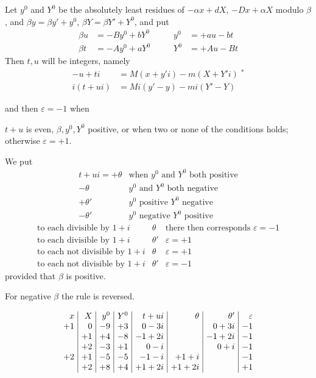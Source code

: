 Let $y^0$ and $Y^0$ be the absolutely least residues of $-\alpha x+dX$, $-Dx+\alpha X$ modulo $\beta$, and $\beta y=\beta y'+y^0$, $\beta Y=\beta Y'+Y^0$, and put
\[
\begin{alignedat}{2}
\beta u&=-By^0+bY^0\qquad&y^0&=+au-bt\\
\beta t&=-Ay^0+aY^0&Y^0&=+Au-Bt
\end{alignedat}
\]
Then $t,u$ will be integers, namely
\[
\begin{aligned}
-u+ti&=M(x+y'i)-m(X+Y'i)\;{}^*\\
i(t+ui)&=Mi(y'-y)-mi(Y'-Y)
\end{aligned}
\]

and then $\varepsilon=-1$ when\par
\noindent $t+u$ is even, $\beta,y^0,Y^0$ positive, or when two or none of the conditions holds; otherwise $\varepsilon=+1$.\par
{}
We put
\[
\begin{array}{rl}
t+ui=+\theta&\text{when }y^0\text{ and }Y^0\text{ both positive}\\
-\theta&y^0\text{ and }Y^0\text{ both negative}\\
+\theta'&y^0\text{ positive }Y^0\text{ negative}\\
-\theta'&y^0\text{ negative }Y^0\text{ positive}
\end{array}
\]
\[
\begin{array}{llr}
\text{to each divisible by }1+i\text{}&\theta&\text{there then corresponds }\varepsilon=-1\\
\text{to each divisible by }1+i\text{}&\theta'&\varepsilon=+1\\
\text{to each not divisible by }1+i\text{}&\theta&\varepsilon=+1\\
\text{to each not divisible by }1+i\text{}&\theta'&\varepsilon=-1
\end{array}
\]
provided that $\beta$ is positive.\par
For negative $\beta$ the rule is reversed.

\[
\setlength{\arraycolsep}{4pt}
\begin{array}{r|r|r|r|r|r|r|r}
x&X&y^0&Y^0&t+ui&\theta&\theta'&\varepsilon\\
+1&0&-9&+3&0-3i&&0+3i&-1\\
&+1&+4&-8&-1+2i&&-1+2i&-1\\
&+2&-3&+1&0-i&&0+i&-1\\
+2&+1&-5&-5&-1-i&+1+i&&-1\\
&+2&+8&+4&+1+2i&+1+2i&&+1
\end{array}
\]

